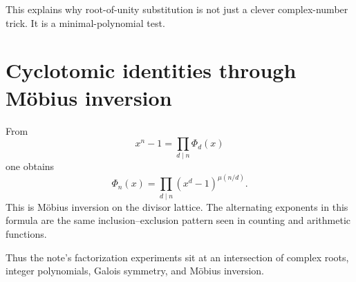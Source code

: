This explains why root-of-unity substitution is not just a clever complex-number trick.  It is a minimal-polynomial test.

\section{Cyclotomic identities through Möbius inversion}

From
\[
  x^n-1=\prod_{d\mid n}\Phi_d(x)
\]
one obtains
\[
  \Phi_n(x)=\prod_{d\mid n}(x^d-1)^{\mu(n/d)}.
\]
This is Möbius inversion on the divisor lattice.  The alternating exponents in this formula are the same inclusion--exclusion pattern seen in counting and arithmetic functions.

Thus the note's factorization experiments sit at an intersection of complex roots, integer polynomials, Galois symmetry, and Möbius inversion.
